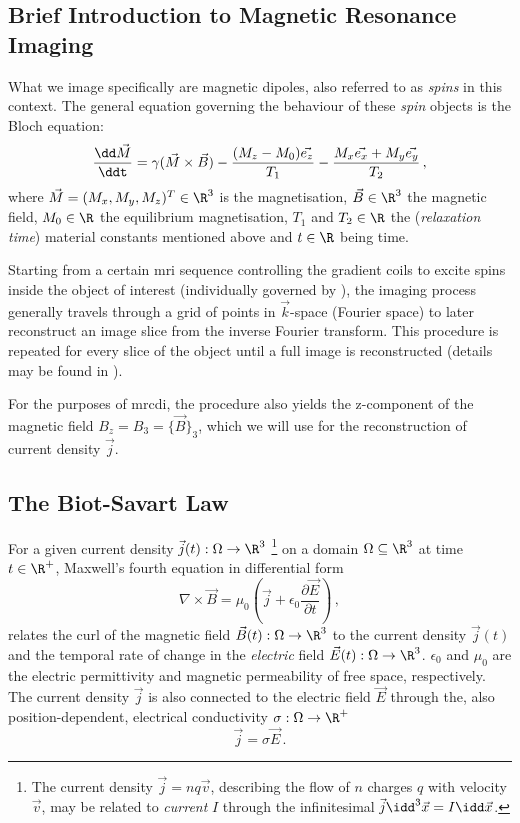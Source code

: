 \documentclass[10pt]{article}
\begin{document}
  \subsection{Brief Introduction to Magnetic Resonance Imaging}
  What we image specifically are magnetic dipoles, also referred to as \textit{spins} in this context.
  The general equation governing the behaviour of these \textit{spin} objects is the Bloch equation:
  \begin{equation}
    \frac{\dd \vec{M}}{\ddt} = \gamma (\vec{M} \times \vec{B}) - \frac{(M_z - M_0) \vec{e_z}}{T_1} - \frac{M_x \vec{e_x} + M_y \vec{e_y}}{T_2}\,,
    \label{eq:bloch}
  \end{equation}
  where $\vec{M} = (M_x, M_y, M_z)^T \in \R^3$ is the magnetisation, $\vec{B} \in \R^3$ the magnetic field, $M_0 \in \R$ the equilibrium magnetisation, $T_1$ and $T_2 \in \R$ the (\textit{relaxation time}) material constants mentioned above and $t \in \R$ being time.

  Starting from a certain \gls{mri} sequence controlling the gradient coils to excite spins inside the object of interest (individually governed by ), the imaging process generally travels through a grid of points in $\vec{k}$-space (Fourier space) to later reconstruct an image slice from the inverse Fourier transform.
  This procedure is repeated for every slice of the object until a full image is reconstructed (details may be found in \cite{1996-mri-basics}).

  For the purposes of \gls{mrcdi}, the procedure also yields the z-component of the magnetic field $B_z = B_3 = \{\vec{B}\}_3$, which we will use for the reconstruction of current density $\vec{j}$.

  \subsection{The Biot-Savart Law}
  For a given current density $\vec{j}(t): \Omega \to \R^3$ \footnote{
    The current density $\vec{j} = nq\vec{v}$, describing the flow of $n$ charges $q$ with velocity $\vec{v}$, may be related to \textit{current} $I$ through the infinitesimal $\vec{j} \idd^3\vec{x} = I \idd\vec{x}$.
  } on a domain $\Omega \subseteq \R^3$ at time $t \in \R^+$, Maxwell's fourth equation in differential form
  \begin{equation*}
    \nabla \times \vec{B} = \mu_0 \left(\vec{j} + \epsilon_0 \frac{\partial \vec{E}}{\partial t}\right)\,,
    \label{eq:maxwell-4}
  \end{equation*}
  relates the curl of the magnetic field $\vec{B}(t): \Omega \to \R^3$ to the current density $\vec{j}(t)$ and the temporal rate of change in the \textit{electric} field $\vec{E}(t): \Omega \to \R^3$.
  $\epsilon_0$ and $\mu_0$ are the electric permittivity and magnetic permeability of free space, respectively.
  The current density $\vec{j}$ is also connected to the electric field $\vec{E}$ through the, also position-dependent, electrical conductivity $\sigma: \Omega \to \R^+$
  $$\vec{j} = \sigma \vec{E}\,.$$
\end{document}
